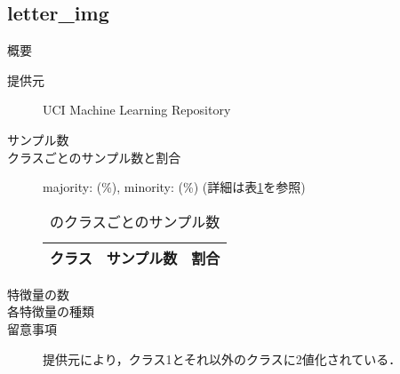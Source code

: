 \subsection{letter\_img}
\begin{description}
    \item[概要] \cite{}
    \item[提供元] UCI Machine Learning Repository
    \item[サンプル数] 
    \item[クラスごとのサンプル数と割合] majority:  (\%), minority:  (\%) (詳細は表\ref{tab:}を参照)

        \begin{table}[htbp]
            \centering
            \caption{のクラスごとのサンプル数}
            \label{tab:}
            \begin{tabular}{lrc} \hline
                \multicolumn{1}{c}{クラス}&
                \multicolumn{1}{c}{サンプル数}&
                \multicolumn{1}{c}{割合}\\
                \hline
                \hline

                \hline
            \end{tabular}
        \end{table}

    \item[特徴量の数] 
    \item[各特徴量の種類] \mbox{}
        
    \item[留意事項] 提供元により，クラス1とそれ以外のクラスに2値化されている．
\end{description}


